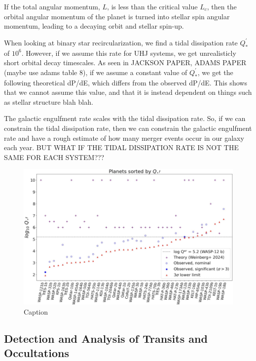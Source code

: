 \documentclass[oneside,12pt]{amsart}
\numberwithin{page}{section}
\begin{document}
If the total angular momentum, $L$, is less than the critical value $L_c$, then the orbital angular momentum of the planet is turned into stellar spin angular momentum, leading to a decaying orbit and stellar spin-up. 

When looking at binary star recircularization, we find a tidal dissipation rate $Q^{'}_{*}$ of $10^6$. However, if we assume this rate for UHJ systems, we get unrealisticly short orbital decay timescales. As seen in JACKSON PAPER, ADAMS PAPER (maybe use adams table 8), if we assume a constant value of $Q^{'}_{*}$, we get the following theoretical dP/dE, which differs from the observed dP/dE. This shows that we cannot assume this value, and that it is instead dependent on things such as stellar structure blah blah. 

The galactic engulfment rate scales with the tidal dissipation rate. So, if we can constrain the tidal dissipation rate, then we can constrain the galactic engulfment rate and have a rough estimate of how many merger events occur in our galaxy each year. BUT WHAT IF THE TIDAL DISSIPATION RATE IS NOT THE SAME FOR EACH SYSTEM??? 

\begin{figure}[htbp]
    \centering
    \includegraphics[width=\linewidth]{figs/adams_fig11.png}
    \caption{Caption}
    \label{fig:adams-fig11}
\end{figure}


\clearpage

\subsection{Detection and Analysis of Transits and Occultations}
\end{document}
